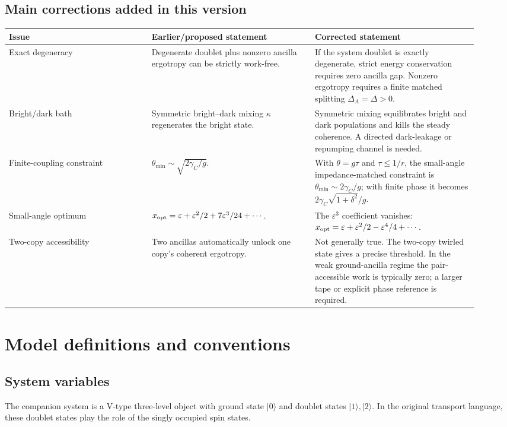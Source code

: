 \documentclass[11pt,a4paper]{article}
\newcommand{\ket}[1]{|#1\rangle}
\newcommand{\eps}{\varepsilon}
\begin{document}
\subsection{Main corrections added in this version}

\begin{longtable}{p{0.28\linewidth}p{0.32\linewidth}p{0.32\linewidth}}
\toprule
Issue & Earlier/proposed statement & Corrected statement \\
\midrule
Exact degeneracy & Degenerate doublet plus nonzero ancilla ergotropy can be strictly work-free. & If the system doublet is exactly degenerate, strict energy conservation requires zero ancilla gap. Nonzero ergotropy requires a finite matched splitting $\Delta_A=\Delta>0$. \\
Bright/dark bath & Symmetric bright--dark mixing $\kappa$ regenerates the bright state. & Symmetric mixing equilibrates bright and dark populations and kills the steady coherence. A directed dark-leakage or repumping channel is needed. \\
Finite-coupling constraint & $\theta_{\min}\sim\sqrt{2\gamma_C/g}$. & With $\theta=g\tau$ and $\tau\le 1/r$, the small-angle impedance-matched constraint is $\theta_{\min}\sim 2\gamma_C/g$; with finite phase it becomes $2\gamma_C\sqrt{1+\delta^2}/g$. \\
Small-angle optimum & $x_{\rm opt}=\eps+\eps^2/2+7\eps^3/24+\cdots$. & The $\eps^3$ coefficient vanishes: $x_{\rm opt}=\eps+\eps^2/2-\eps^4/4+\cdots$. \\
Two-copy accessibility & Two ancillas automatically unlock one copy's coherent ergotropy. & Not generally true. The two-copy twirled state gives a precise threshold. In the weak ground-ancilla regime the pair-accessible work is typically zero; a larger tape or explicit phase reference is required. \\
\bottomrule
\end{longtable}

\section{Model definitions and conventions}

\subsection{System variables}

The companion system is a V-type three-level object with ground state $\ket{0}$ and doublet states $\ket{1},\ket{2}$. In the original transport language, these doublet states play the role of the singly occupied spin states.
\end{document}
